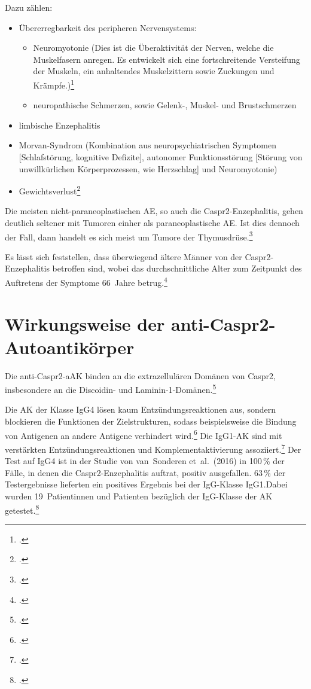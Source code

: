 Dazu zählen:
\begin{itemize}
	\item Übererregbarkeit des peripheren Nervensystems:
	\begin{itemize}
		\item Neuromyotonie (Dies ist die Überaktivität der Nerven, welche die Muskelfasern anregen. Es entwickelt sich eine fortschreitende Versteifung der Muskeln, ein anhaltendes Muskelzittern sowie Zuckungen und Krämpfe.)\footcite{MSDNeuromyothonie2024}
		\item neuropathische Schmerzen, sowie Gelenk-, Muskel- und
		Brustschmerzen
	\end{itemize}
	\item limbische Enzephalitis
	\item Morvan-Syndrom (Kombination aus neuropsychiatrischen Symptomen
	[Schlafstörung, kognitive Defizite], autonomer
	Funktionsstörung [Störung von unwillkürlichen Körperprozessen, wie Herzschlag] und Neuromyotonie)
	\item Gewichtsverlust\footcites[S.~523; 526]{VanSonderen2016}%
	[S.~527; 530]{Heine2022}
\end{itemize}

Die meisten nicht-paraneoplastischen AE, so auch die
Caspr2-Enzephalitis, gehen deutlich seltener mit
Tumoren einher als paraneoplastische AE. Ist dies dennoch der Fall, dann handelt es sich
meist um Tumore der Thymusdrüse.\footcite[S.~527; 530]{Heine2022}

Es lässt sich feststellen, dass überwiegend ältere Männer von der
Caspr2-Enzephalitis betroffen sind, wobei das durchschnittliche Alter zum
Zeitpunkt des Auftretens der Symptome 66~Jahre
betrug.\footcite[S.~522--523; 526]{VanSonderen2016}

\section{Wirkungsweise der anti-Caspr2-Autoantikörper}

Die anti-Caspr2-aAK binden an die
extrazellulären Domänen von Caspr2, insbesondere an die Discoidin- und
Laminin-1-Domänen.\footcite[S.~6]{Olsen2015}

Die AK der Klasse IgG4 lösen kaum Entzündungsreaktionen aus, sondern
blockieren die Funktionen der Zielstrukturen, sodass beispielsweise die
Bindung von Antigenen an andere Antigene verhindert
wird.\footcite{AntwerpesIgG4}
Die IgG1-AK sind mit verstärkten Entzündungsreaktionen und
Komplementaktivierung assoziiert.\footcite{Mitrevski}
Der Test auf IgG4 ist in der Studie von van~Sonderen et~al.\ (2016) in
100\,\% der Fälle, in denen die Caspr2-Enzephalitis auftrat, positiv
ausgefallen. 63\,\% der Testergebnisse lieferten ein positives Ergebnis
bei der IgG-Klasse IgG1.Dabei wurden 19~Patientinnen und Patienten bezüglich
der IgG-Klasse der AK getestet.\footcite[S.~524]{VanSonderen2016}

